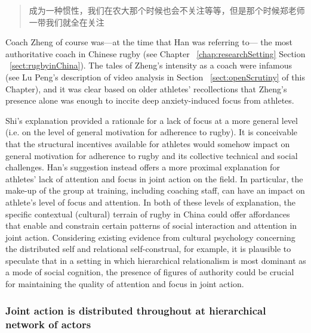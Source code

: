 \begin{CJK}{UTF8}{gbsn}
\begin{quotation}
    成为一种惯性，我们在农大那个时候也会不关注等等，但是那个时候郑老师一带我们就全在关注
\end{quotation}

Coach Zheng of course was---at the time that Han was referring to--- the most authoritative coach in Chinese rugby (see Chapter ~\ref{chap:researchSetting} Section ~\ref{sect:rugbyinChina}). The tales of Zheng's intensity as a coach were infamous (see Lu Peng's description of video analysis in Section ~\ref{sect:openScrutiny} of this Chapter), and it was clear based on older athletes' recollections that Zheng's presence alone was enough to inccite deep anxiety-induced focus from athletes.

Shi's explanation provided a rationale for a lack of focus at a more general level (i.e. on the level of general motivation for adherence to rugby). It is conceivable that the structural incentives available for athletes would somehow impact on general motivation for adherence to rugby and its collective technical and social challenges.  Han's suggestion instead offers a more proximal explanation for athletes' lack of attention and focus in joint action on the field. In particular, the make-up of the group at training, including coaching staff, can have an impact on athlete's level of focus and attention.
In both of these levels of explanation, the specific contextual (cultural) terrain of rugby in China could offer affordances that enable and constrain certain patterns of social interaction and attention in joint action.  Considering existing evidence from cultural psychology concerning the distributed self and relational self-construal, for example, it is plausible to speculate that in a setting in which hierarchical relationalism is most dominant as a mode of social cognition, the presence of figures of authority could be crucial for maintaining the quality of attention and focus in joint action.

\subsubsection{Joint action is distributed throughout at hierarchical network of actors}


\end{CJK}
